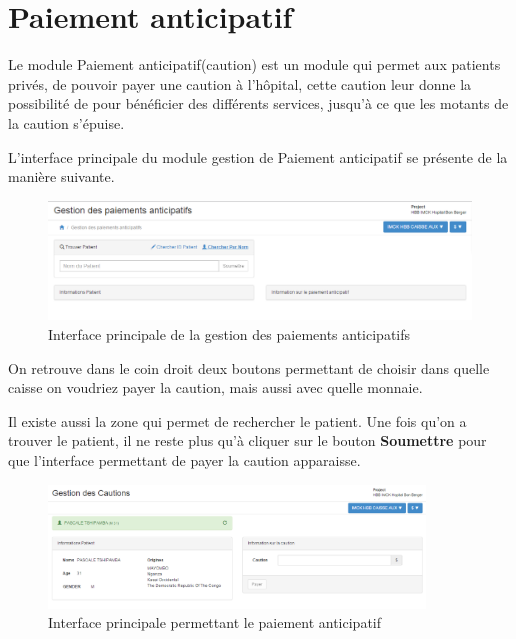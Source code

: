 \documentclass[12pt,a4paper]{report}
\begin{document}
\newpage
\section{Paiement anticipatif}
Le module Paiement anticipatif(caution) est un module qui permet aux patients privés, de pouvoir payer une caution à l'hôpital, cette caution leur donne la possibilité de pour bénéficier des différents services, jusqu'à ce que les motants de la caution s'épuise.

L'interface principale du module gestion de Paiement anticipatif se présente de la manière suivante.

\begin{figure}[h]
\begin{center}
\includegraphics[width=14cm]{pic/cautionInterface.png}
\end{center}
\caption{Interface principale de la gestion des paiements anticipatifs}
\label{Interface principale de la gestion des paiements anticipatifs}
\end{figure}

On retrouve dans le coin droit deux boutons permettant de choisir dans quelle caisse on voudriez payer la caution, mais aussi avec quelle monnaie. 

Il existe aussi la zone qui permet de rechercher le patient. Une fois qu'on a trouver le patient, il ne reste plus qu'à cliquer sur le bouton \textbf{Soumettre} pour que l'interface permettant de payer la caution apparaisse.

\begin{figure}[h]
\begin{center}
\includegraphics[width=10cm]{pic/formGestionCaution.png}
\end{center}
\caption{Interface principale permettant le paiement anticipatif}
\label{Interface principale permettant le paiement anticipatif}
\end{figure}
\end{document}
